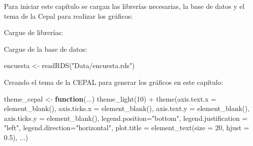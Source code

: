 \documentclass[
  12pt,
]{book}
\newenvironment{Shaded}{\begin{snugshade}}{\end{snugshade}}
\newcommand{\AttributeTok}[1]{\textcolor[rgb]{0.77,0.63,0.00}{#1}}
\newcommand{\ConstantTok}[1]{\textcolor[rgb]{0.00,0.00,0.00}{#1}}
\newcommand{\ControlFlowTok}[1]{\textcolor[rgb]{0.13,0.29,0.53}{\textbf{#1}}}
\newcommand{\DecValTok}[1]{\textcolor[rgb]{0.00,0.00,0.81}{#1}}
\newcommand{\FloatTok}[1]{\textcolor[rgb]{0.00,0.00,0.81}{#1}}
\newcommand{\FunctionTok}[1]{\textcolor[rgb]{0.00,0.00,0.00}{#1}}
\newcommand{\NormalTok}[1]{#1}
\newcommand{\OtherTok}[1]{\textcolor[rgb]{0.56,0.35,0.01}{#1}}
\newcommand{\SpecialCharTok}[1]{\textcolor[rgb]{0.00,0.00,0.00}{#1}}
\newcommand{\StringTok}[1]{\textcolor[rgb]{0.31,0.60,0.02}{#1}}
\begin{document}
Para iniciar este capítulo se cargan las librerías necesarias, la base de datos y el tema de la Cepal para realizar los gráficos:

Cargue de librerías:

\begin{Shaded}
\end{Shaded}

Cargue de la base de datos:

\begin{Shaded}
\begin{Highlighting}[]
\NormalTok{encuesta }\OtherTok{\textless{}{-}} \FunctionTok{readRDS}\NormalTok{(}\StringTok{"Data/encuesta.rds"}\NormalTok{) }
\end{Highlighting}
\end{Shaded}

Creando el tema de la CEPAL para generar los gráficos en este capítulo:

\begin{Shaded}
\begin{Highlighting}[]
\NormalTok{theme\_cepal }\OtherTok{\textless{}{-}} \ControlFlowTok{function}\NormalTok{(...) }\FunctionTok{theme\_light}\NormalTok{(}\DecValTok{10}\NormalTok{) }\SpecialCharTok{+} 
  \FunctionTok{theme}\NormalTok{(}\AttributeTok{axis.text.x =} \FunctionTok{element\_blank}\NormalTok{(),}
        \AttributeTok{axis.ticks.x =} \FunctionTok{element\_blank}\NormalTok{(),}
        \AttributeTok{axis.text.y =} \FunctionTok{element\_blank}\NormalTok{(),}
        \AttributeTok{axis.ticks.y =} \FunctionTok{element\_blank}\NormalTok{(),}
        \AttributeTok{legend.position=}\StringTok{"bottom"}\NormalTok{, }
        \AttributeTok{legend.justification =} \StringTok{"left"}\NormalTok{, }
        \AttributeTok{legend.direction=}\StringTok{"horizontal"}\NormalTok{,}
        \AttributeTok{plot.title =} \FunctionTok{element\_text}\NormalTok{(}\AttributeTok{size =} \DecValTok{20}\NormalTok{, }\AttributeTok{hjust =} \FloatTok{0.5}\NormalTok{),}
\NormalTok{        ...) }
\end{Highlighting}
\end{Shaded}
\end{document}
